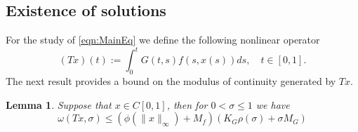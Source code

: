 \documentclass[12pt,a4paper]{article}
\newtheorem{lem}{Lemma}
\begin{document}
\subsection{Existence of solutions}
For the study of \eqref{eqn:MainEq} we define the following nonlinear operator
\begin{equation}\label{eqn:OpeartorT}
	(Tx)(t) := \int_0^t G(t,s) f(s, x(s)) ds, \quad t \in [0,1].
\end{equation}
The next result provides a bound on the modulus of continuity generated by $Tx$.
\begin{lem}\label{lem:ModulusT}
	Suppose that $x\in C[0,1]$, then for $0<\sigma \leq 1$ we have
	\begin{equation}\label{eqn:ModulusT}
		\omega(Tx, \sigma) \leq \left(\phi(\|x\|_\infty) + M_f\right) \left(K_G\rho(\sigma) + \sigma M_G\right)
	\end{equation}
\end{lem}
\end{document}
